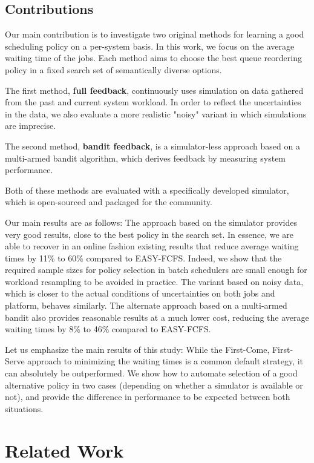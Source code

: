 \documentclass[sigconf,anonymous]{acmart}
\begin{document}
\subsection{Contributions}

Our main contribution is to investigate two original methods for learning a
good scheduling policy on a per-system basis. In this work, we focus on the
average waiting time of the jobs. Each method aims to choose the best queue
reordering policy in a fixed search set of semantically diverse options.

The first method, \textbf{full feedback}, continuously uses simulation on data gathered
from the past and current system workload. In order to reflect the
uncertainties in the data, we also evaluate a more realistic "noisy" variant in
which simulations are imprecise.

The second method, \textbf{bandit feedback}, is a simulator-less approach based on a
multi-armed bandit algorithm, which derives feedback by measuring system
performance.

Both of these methods are evaluated with a specifically developed simulator,
which is open-sourced and packaged for the community.


Our main results are as follows: The approach based on the simulator provides
very good results, close to the best policy in the search set. In essence, we
are able to recover in an online fashion existing results that reduce average
waiting times by 11\% to 60\% compared to EASY-FCFS.  Indeed, we show
that the required sample sizes for policy selection in batch schedulers are
small enough for workload resampling to be avoided in practice. The variant
based on noisy data, which is closer to the actual conditions of uncertainties on
both jobs and platform, behaves similarly. The alternate approach based on
a multi-armed bandit also provides reasonable results at a much lower cost,
reducing the average waiting times by 8\% to 46\% compared to
EASY-FCFS.

Let us emphasize the main results of this study: While the First-Come,
First-Serve approach to minimizing the waiting times is a common default
strategy, it can absolutely be outperformed.  We show how to automate selection
of a good alternative policy in two cases (depending on whether a simulator is
available or not), and provide the difference in performance to be expected
between both situations.

\section{Related Work}
\label{sec:rw}
\end{document}
